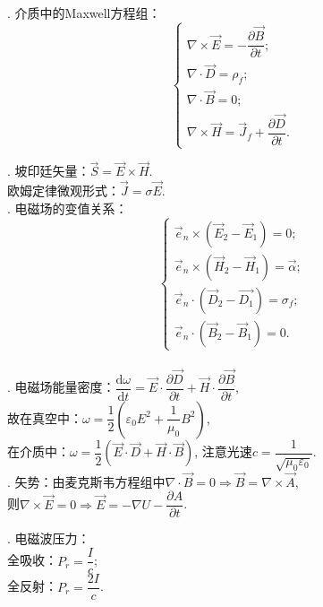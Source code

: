 \documentclass[12pt, 
]{article}
\begin{document}
. 介质中的Maxwell方程组：
\[
	\left\{
	\begin{array}{l}
		\nabla\times\vec{E}=-\dfrac{\partial\vec{B}}{\partial t};\\
		\nabla\cdot\vec{D}=\rho_f;\\
		\nabla\cdot\vec{B}=0;\\
		\nabla\times\vec{H}=\vec{J}_f+\dfrac{\partial\vec{D}}{\partial t}.
	\end{array}
	\right.
\]

. 坡印廷矢量：$\vec{S}=\vec{E}\times\vec{H}$.
~\\\phantom{~~~~}欧姆定律微观形式：$\vec{J}=\sigma\vec{E}$.
~\\

. 电磁场的变值关系：
\[
	\left\{
	\begin{array}{l}
		\vec{e}_n\times(\vec{E}_2-\vec{E}_1)=0;\\
		\vec{e}_n\times(\vec{H}_2-\vec{H}_1)=\vec{\alpha};\\
		\vec{e}_n\cdot(\vec{D}_2-\vec{D_1})=\sigma_f;\\
		\vec{e}_n\cdot(\vec{B}_2-\vec{B}_1)=0.
	\end{array}
	\right.
\]
~\\

. 电磁场能量密度：$\dfrac{\mathrm{d}\omega}{\mathrm{d} t}=\vec{E}\cdot\dfrac{\partial\vec{D}}{\partial t}+\vec{H}\cdot\dfrac{\partial\vec{B}}{\partial t}$,
~\\\phantom{~~~~~}故在真空中：$\omega=\dfrac{1}{2}(\varepsilon_0 E^2+\dfrac{1}{\mu_0}B^2)$,
~\\\phantom{~~~~~故}在介质中：$\omega=\dfrac{1}{2}(\vec{E}\cdot\vec{D}+\vec{H}\cdot\vec{B})$, 注意光速$c=\dfrac{1}{\sqrt{\mu_0\varepsilon_0}}$.
~\\

. 矢势：由麦克斯韦方程组中$\nabla\cdot\vec{B}=0\Rightarrow\vec{B}=\nabla\times\vec{A}$,
~\\\phantom{~~~~~矢势：}则$\nabla\times\vec{E}=0\Rightarrow\vec{E}=-\nabla U-\dfrac{\partial A}{\partial t}$.
~\\

. 电磁波压力：
~\\\phantom{~~~~~~~}全吸收：$P_r=\dfrac{I}{c}$;
~\\\phantom{~~~~~~~}全反射：$P_r=\dfrac{2I}{c}$.
~\\
\end{document}
